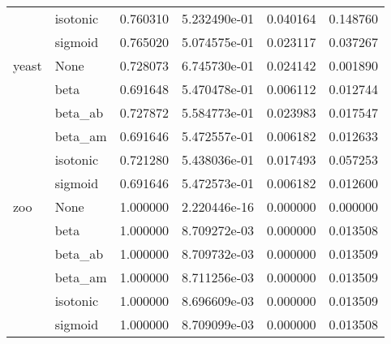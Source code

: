 \begin{tabular}{llrrrr}
        & isotonic &  0.760310 &  5.232490e-01 &  0.040164 &  0.148760 \\
        & sigmoid &  0.765020 &  5.074575e-01 &  0.023117 &  0.037267 \\
yeast & None &  0.728073 &  6.745730e-01 &  0.024142 &  0.001890 \\
        & beta &  0.691648 &  5.470478e-01 &  0.006112 &  0.012744 \\
        & beta\_ab &  0.727872 &  5.584773e-01 &  0.023983 &  0.017547 \\
        & beta\_am &  0.691646 &  5.472557e-01 &  0.006182 &  0.012633 \\
        & isotonic &  0.721280 &  5.438036e-01 &  0.017493 &  0.057253 \\
        & sigmoid &  0.691646 &  5.472573e-01 &  0.006182 &  0.012600 \\
zoo & None &  1.000000 &  2.220446e-16 &  0.000000 &  0.000000 \\
        & beta &  1.000000 &  8.709272e-03 &  0.000000 &  0.013508 \\
        & beta\_ab &  1.000000 &  8.709732e-03 &  0.000000 &  0.013509 \\
        & beta\_am &  1.000000 &  8.711256e-03 &  0.000000 &  0.013509 \\
        & isotonic &  1.000000 &  8.696609e-03 &  0.000000 &  0.013509 \\
        & sigmoid &  1.000000 &  8.709099e-03 &  0.000000 &  0.013508 \\
\bottomrule
\end{tabular}
